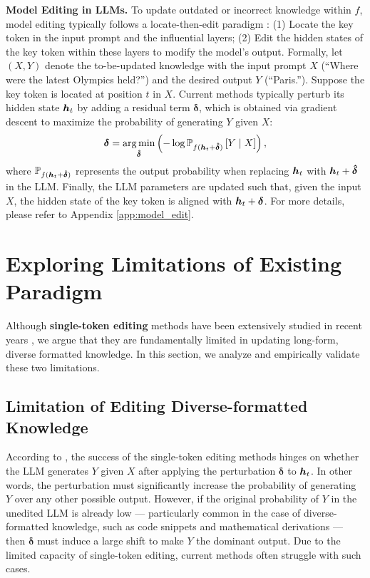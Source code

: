 \textbf{Model Editing in LLMs.} To update outdated or incorrect knowledge within $f$, model editing typically follows a locate-then-edit paradigm \cite{ROME}: (1) Locate the key token in the input prompt and the influential layers; (2) Edit the hidden states of the key token within these layers to modify the model’s output. Formally, let $(X, Y)$ denote the to-be-updated knowledge with the input prompt $X$ (\eg ``Where were the latest Olympics held?'') and the desired output $Y$ (\eg ``Paris.''). 
Suppose the key token is located at position $t$ in $X$.
Current methods typically perturb its hidden state ${\bm{h}}_t$ by adding a residual term $\bm{\delta}$, which is  obtained via gradient descent to maximize the probability of generating $Y$ given $X$:
\begin{equation}
    \bm{\delta}= \operatorname*{arg\,min}_{\bm{\hat{\delta}}} \left( -\log \mathbb{P}_{f({\bm{h}}_t+\bm{\hat{\delta}})} \left[Y \mid X\right] \right),\label{opt}
\end{equation}
where $\mathbb{P}_{f({\bm{h}}_t+\bm{\hat{\delta}})}$ represents the output probability when replacing ${\bm{h}}_t$ with ${\bm{h}}_t+\bm{\hat{\delta}}$ in the LLM.  Finally, the LLM parameters are updated such that, given the input $X$, the hidden state of the key token is aligned with ${\bm{h}}_t+\bm{\delta}$. For more details, please refer to Appendix \ref{app:model_edit}. 

\section{Exploring Limitations of Existing Paradigm} \label{sec:lim} 

Although \textbf{single-token editing} methods have been extensively studied in recent years \cite{AlphaEdit,wise,UnKE,RECT,AKEW}, we argue that they are fundamentally limited in updating long-form, diverse formatted knowledge. In this section, we analyze and empirically validate these two limitations.

\subsection{Limitation of Editing Diverse-formatted Knowledge} \label{sec:method:lim:div}

According to , the success of the single-token editing methods hinges on whether the LLM generates $Y$ given $X$ after applying the perturbation $\bm{\delta}$ to ${\bm{h}}_t$.
In other words, the perturbation must significantly increase the probability of generating $Y$ over any other possible output. However, if the original probability of $Y$ in the unedited LLM is already low --- particularly common in the case of diverse-formatted knowledge, such as code snippets and mathematical derivations --- then $\bm{\delta}$ must induce a large shift to make $Y$ the dominant output. Due to the limited capacity of single-token editing, current methods often struggle with such cases.

